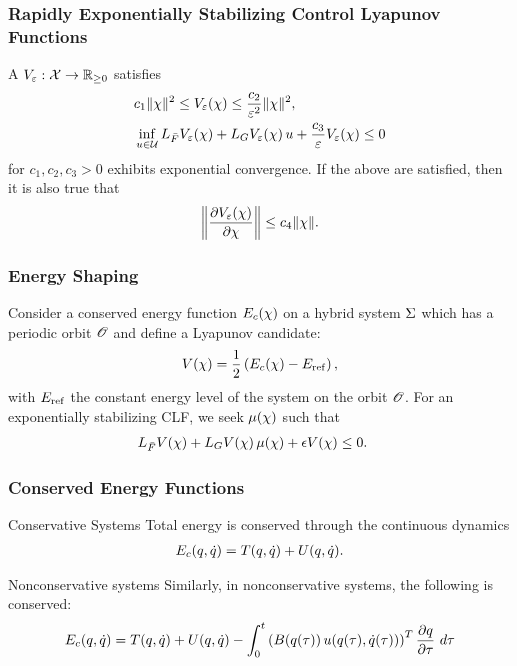 \begin{frame}[t]
  \frametitle{Rapidly Exponentially Stabilizing Control Lyapunov Functions}
  A 
  $V_{\varepsilon} : \mathcal{X} \to \mathbb{R}_{\geq 0}$ satisfies
  \begin{align*}
    &c_{1} \|\chi\|^{2} \leq V_{\varepsilon}(\chi) \leq \frac{c_{2}}{\varepsilon^{2}} \|\chi\|^{2},\\
    &\inf_{u \in \mathcal{U}} L_{{\bar {F}}}V_{\varepsilon}(\chi) + L_{G}V_{\varepsilon}(\chi) \, u +
    \frac{c_{3}}{\varepsilon} V_{\varepsilon}(\chi) \leq 0
  \end{align*}
  for $c_{1}, c_{2}, c_{3} > 0$ exhibits exponential convergence. If the above
  are satisfied, then it is also true that
  \begin{align*}
    \left\| \frac{\partial{V_{\varepsilon}(\chi)}}{\partial{\chi}} \right\| \leq c_{4} \|\chi\|.
  \end{align*}
\end{frame}

\begin{frame}[t]
  \frametitle{Energy Shaping}
  Consider a conserved energy function $E_{c}(\chi)$ on a hybrid system $\Sigma$
  which has a periodic orbit $\mathscr O$ and define a Lyapunov candidate:
  \begin{align*}
    V(\chi) = \frac{1}{2} \left(E_{c}(\chi) - E_{\mathrm{ref}}\right),
  \end{align*}
  with $E_{\mathrm{ref}}$ the constant energy level of the system on the orbit
  $\mathscr O$. For an exponentially stabilizing CLF, we seek $\mu(\chi)$ such that
  \begin{align*}
    L_{{\bar {F}}} V(\chi) + L_{G} V(\chi) \, \mu(\chi) + \epsilon V(\chi) &\leq 0.
  \end{align*}
\end{frame}

\begin{frame}[t]
  \frametitle{Conserved Energy Functions}
  \begin{block}{Conservative Systems}
    Total energy is conserved through the continuous dynamics
    \begin{align*}
      E_{c}(q, \dot q) = T(q, \dot q) + U(q, \dot q).
    \end{align*}
    \end{block}
    \begin{block}{Nonconservative systems}
      Similarly, in nonconservative systems, the following is conserved:
      \begin{align*}
        E_{c}(q, \dot q) = T(q, \dot q) + U(q, \dot q) - \int_{0}^{t} \left( B(q(\tau)) \,
        u(q(\tau), \dot q(\tau)) \right)^{T} \frac{\partial{\ensuremath{q}}}{\partial{\tau}} \ d\tau
    \end{align*}
  \end{block}
\end{frame}

